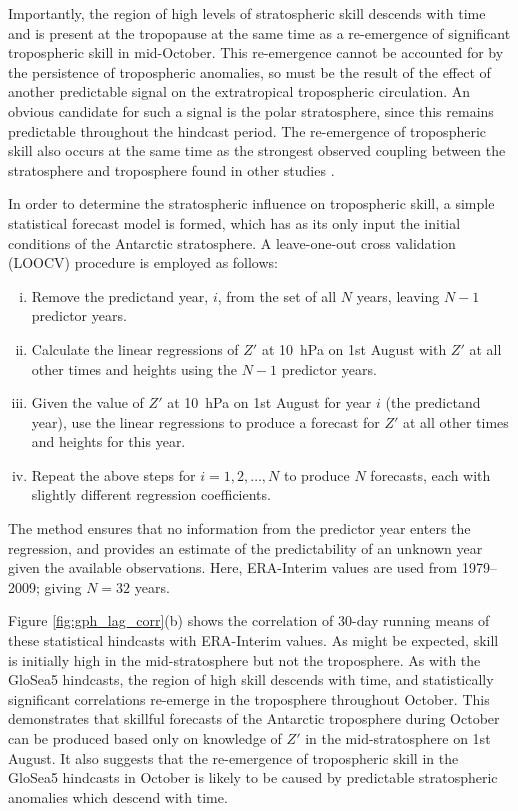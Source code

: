 Importantly, the region of high levels of stratospheric skill descends with time
and is present at the tropopause at the same time as a re-emergence of
significant tropospheric skill in mid-October. This re-emergence cannot be
accounted for by the persistence of tropospheric anomalies, so must be the
result of the effect of another predictable signal on the extratropical
tropospheric circulation. An obvious candidate for such a signal is the polar
stratosphere, since this remains predictable throughout the hindcast period. The
re-emergence of tropospheric skill also occurs at the same time as the strongest
observed coupling between the stratosphere and troposphere found in other
studies \citep[e.g.,][]{Thompson2005, Simpson2011}.

In order to determine the stratospheric influence on tropospheric skill, a
simple statistical forecast model is formed, which has as its only input the
initial conditions of the Antarctic stratosphere. A leave-one-out cross
validation (LOOCV) \citep{Wilks} procedure is employed as follows:
\begin{enumerate}[i.]
\item Remove the predictand year, $i$, from the set of all $N$ years, leaving
  $N-1$ predictor years. 
\item Calculate the linear regressions of $Z'$ at 10~hPa on 1st August with $Z'$
  at all other times and heights using the $N-1$ predictor years.
\item Given the value of $Z'$ at 10~hPa on 1st August for year $i$ (the
  predictand year), use the linear regressions to produce a forecast for $Z'$ at
  all other times and heights for this year. 
\item Repeat the above steps for $i=1,2,\dots,N$ to produce $N$ forecasts, each
  with slightly different regression coefficients.
\end{enumerate}
The method ensures that no information from the predictor year enters the
regression, and provides an estimate of the predictability of an unknown year
given the available observations. Here, ERA-Interim values are used from
1979--2009; giving $N=32$ years.


Figure \ref{fig:gph_lag_corr}(b) shows the correlation of 30-day running means
of these statistical hindcasts with ERA-Interim values. As might be expected,
skill is initially high in the mid-stratosphere but not the troposphere. As with
the GloSea5 hindcasts, the region of high skill descends with time, and
statistically significant correlations re-emerge in the troposphere throughout
October. This demonstrates that skillful forecasts of the Antarctic troposphere
during October can be produced based only on knowledge of $Z'$ in the
mid-stratosphere on 1st August. It also suggests that the re-emergence of
tropospheric skill in the GloSea5 hindcasts in October is likely to be caused by
predictable stratospheric anomalies which descend with time.

